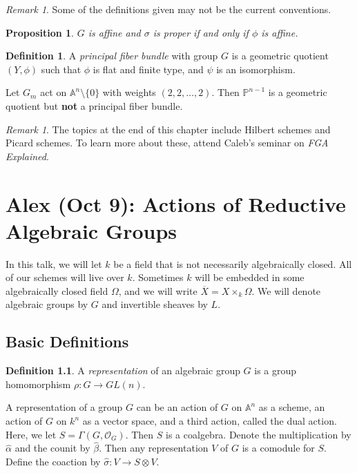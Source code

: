 \documentclass[leqno, openany]{memoir}
\newtheorem{prop}[thm]{Proposition}
\theoremstyle{definition}
\newtheorem{defn}[thm]{Definition}
\theoremstyle{remark}
\newtheorem{rmk}[thm]{Remark}
\theoremstyle{plain}
\theoremstyle{definition}
\theoremstyle{remark}
\newcommand{\A}{\mathbb{A}}
\renewcommand{\P}{\mathbb{P}}
\newcommand{\mc}[1]{\mathcal{#1}}
\newcommand{\ol}[1]{\overline{#1}}
\newcommand{\wh}[1]{\widehat{#1}}
\begin{document}
\begin{rmk} Some of the definitions given may not be the current conventions.
\end{rmk}

\begin{prop} $G$ is affine and $\sigma$ is proper if and only if $\phi$ is
affine.  \end{prop}

\begin{defn} A \textit{principal fiber bundle} with group $G$ is a geometric
quotient $(Y, \phi)$ such that $\phi$ is flat and finite type, and $\psi$ is an
isomorphism.  \end{defn}

Let $G_m$ act on $\A^n \setminus \{0 \}$ with weights $(2,2,\ldots,2)$. Then
$\P^{n-1}$ is a geometric quotient but \textbf{not} a principal fiber bundle.

\begin{rmk} The topics at the end of this chapter include Hilbert schemes and
Picard schemes. To learn more about these, attend Caleb's seminar on
\textit{FGA Explained}.  \end{rmk}

\chapter{Alex (Oct 9): Actions of Reductive Algebraic Groups}%
\label{cha:alex_oct_9_actions_of_reductive_algebraic_groups}

In this talk, we will let $k$ be a field that is not necessarily algebraically
closed. All of our schemes will live over $k$. Sometimes $k$ will be embedded
in some algebraically closed field $\Omega$, and we will write $\ol{X} = X
\times_k \Omega$. We will denote algebraic groups by $G$ and invertible sheaves
by $L$.

\section{Basic Definitions}%

\begin{defn} A \textit{representation} of an algebraic group $G$ is a group
homomorphism $\rho \colon G \to GL(n)$.  \end{defn}

A representation of a group $G$ can be an action of $G$ on $\A^n$ as a scheme,
an action of $G$ on $k^n$ as a vector space, and a third action, called the
dual action. Here, we let $S = \Gamma(G, \mc{O}_G)$. Then $S$ is a coalgebra.
Denote the multiplication by $\wh{\alpha}$ and the counit by $\wh{\beta}$. Then
any representation $V$ of $G$ is a comodule for $S$. Define the coaction by
$\wh{\sigma} \colon V \to S \otimes V$.
\end{document}
